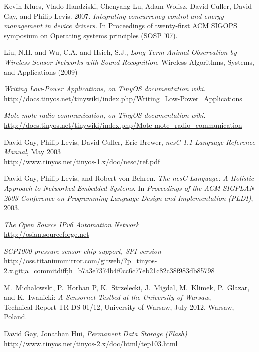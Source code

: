 \begin{thebibliography}{99}
 Kevin Klues, Vlado Handziski, Chenyang Lu, Adam Wolisz, David Culler, David Gay, and Philip Levis. 2007.  \textit{Integrating concurrency control and energy management in device drivers.} In Proceedings of twenty-first ACM SIGOPS symposium on Operating systems principles (SOSP '07). 

 Liu, N.H. and Wu, C.A. and Hsieh, S.J., \textit{Long-Term Animal Observation by Wireless Sensor Networks with Sound Recognition}, Wireless Algorithms, Systems, and Applications (2009)

 \textit{Writing Low-Power Applications, on TinyOS documentation wiki.} \\ \url{http://docs.tinyos.net/tinywiki/index.php/Writing_Low-Power_Applications}

 \textit{Mote-mote radio communication, on TinyOS documentation wiki.} \\ \url{http://docs.tinyos.net/tinywiki/index.php/Mote-mote_radio_communication}

 David Gay, Philip Levis, David Culler, Eric Brewer, \textit{nesC 1.1 Language Reference Manual}, May 2003 \\ \url{http://www.tinyos.net/tinyos-1.x/doc/nesc/ref.pdf}

 David Gay, Philip Levis, and Robert von Behren.  \textit{The nesC Language: A Holistic Approach to Networked Embedded Systems}.  \newblock In {\em Proceedings of the ACM SIGPLAN 2003 Conference on Programming Language Design and Implementation (PLDI)}, 2003.

 \textit{The Open Source IPv6 Automation Network} \\ \url{http://osian.sourceforge.net}

 \textit{SCP1000 pressure sensor chip support, SPI version} \\ \url{http://oss.titaniummirror.com/gitweb/?p=tinyos-2.x.git;a=commitdiff;h=b7a3e7374b4f0cc6c77eb21c82c38f983db85798}

 M.~Michalowski, P.~Horban P, K.~Strzelecki, J.~Migdal, M.~Klimek, P.~Glazar, and K.~Iwanicki: \textit{A Sensornet Testbed at the University of Warsaw}, \\ Technical Report TR-DS-01/12, University of Warsaw, July 2012, Warsaw, Poland.

 David Gay, Jonathan Hui, \textit{Permanent Data Storage (Flash)} \\ \url{http://www.tinyos.net/tinyos-2.x/doc/html/tep103.html}


\end{thebibliography}
